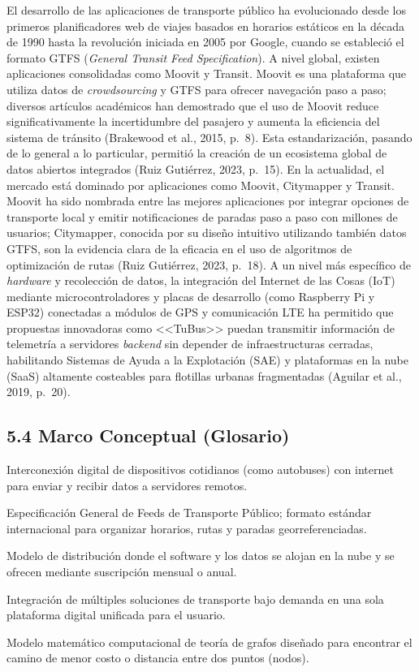 \documentclass[12pt,letterpaper]{article}
\newcommand{\subseccion}[1]{%
  \subsection*{#1}\addcontentsline{toc}{subsection}{#1}}
\begin{document}
El desarrollo de las aplicaciones de transporte público ha evolucionado desde
los primeros planificadores web de viajes basados en horarios estáticos en la
década de 1990 hasta la revolución iniciada en 2005 por Google, cuando se
estableció el formato GTFS (\textit{General Transit Feed Specification}). A
nivel global, existen aplicaciones consolidadas como Moovit y Transit. Moovit es
una plataforma que utiliza datos de \textit{crowdsourcing} y GTFS para ofrecer
navegación paso a paso; diversos artículos académicos han demostrado que el uso
de Moovit reduce significativamente la incertidumbre del pasajero y aumenta la
eficiencia del sistema de tránsito (Brakewood et al., 2015, p.~8). Esta
estandarización, pasando de lo general a lo particular, permitió la creación de
un ecosistema global de datos abiertos integrados (Ruiz Gutiérrez, 2023,
p.~15). En la actualidad, el mercado está dominado por aplicaciones como
Moovit, Citymapper y Transit. Moovit ha sido nombrada entre las mejores
aplicaciones por integrar opciones de transporte local y emitir notificaciones
de paradas paso a paso con millones de usuarios; Citymapper, conocida por su
diseño intuitivo utilizando también datos GTFS, son la evidencia clara de la
eficacia en el uso de algoritmos de optimización de rutas (Ruiz Gutiérrez,
2023, p.~18). A un nivel más específico de \textit{hardware} y recolección de
datos, la integración del Internet de las Cosas (IoT) mediante
microcontroladores y placas de desarrollo (como Raspberry Pi y ESP32)
conectadas a módulos de GPS y comunicación LTE ha permitido que propuestas
innovadoras como <<TuBus>> puedan transmitir información de telemetría a
servidores \textit{backend} sin depender de infraestructuras cerradas,
habilitando Sistemas de Ayuda a la Explotación (SAE) y plataformas en la nube
(SaaS) altamente costeables para flotillas urbanas fragmentadas (Aguilar et
al., 2019, p.~20).

\subseccion{5.4 Marco Conceptual (Glosario)}

\begin{description}[leftmargin=0pt,style=unboxed,font=\normalfont\bfseries]
  \item[IoT (Internet de las Cosas):] Interconexión digital de dispositivos
    cotidianos (como autobuses) con internet para enviar y recibir datos a
    servidores remotos.
  \item[GTFS:] Especificación General de Feeds de Transporte Público; formato
    estándar internacional para organizar horarios, rutas y paradas
    georreferenciadas.
  \item[SaaS (Software como Servicio):] Modelo de distribución donde el
    software y los datos se alojan en la nube y se ofrecen mediante suscripción
    mensual o anual.
  \item[Movilidad como un Servicio (MaaS):] Integración de múltiples soluciones
    de transporte bajo demanda en una sola plataforma digital unificada para el
    usuario.
  \item[Algoritmo de Dijkstra:] Modelo matemático computacional de teoría de
    grafos diseñado para encontrar el camino de menor costo o distancia entre
    dos puntos (nodos).
\end{description}
\end{document}
